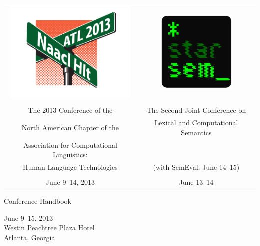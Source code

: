\thispagestyle{empty}

\mbox{}\vfill

\begin{center}
  \begin{tabular}{cc}
    \includegraphics[width=2.5in]{content/fmatter/NAACL2013.pdf}
    & \includegraphics[width=1.5in]{content/fmatter/STARSEM.pdf} \\
    \vspace{0.5in} \\
    The 2013 Conference of the                     & The Second Joint Conference on \\
    North American Chapter of the                  & Lexical and Computational Semantics \\
    Association for Computational Linguistics: \\  
    Human Language Technologies                    & (with SemEval, June 14--15) \\
    \\
    June 9--14, 2013                               & June 13--14 \\
  \end{tabular}

  \vspace{0.5in}
  {\huge Conference Handbook}\vspace{3em}

  {\large June 9--15, 2013 \\
    Westin Peachtree Plaza Hotel \\
    Atlanta, Georgia}
  \vspace{2em}

  \vfill

\end{center}
\newpage
